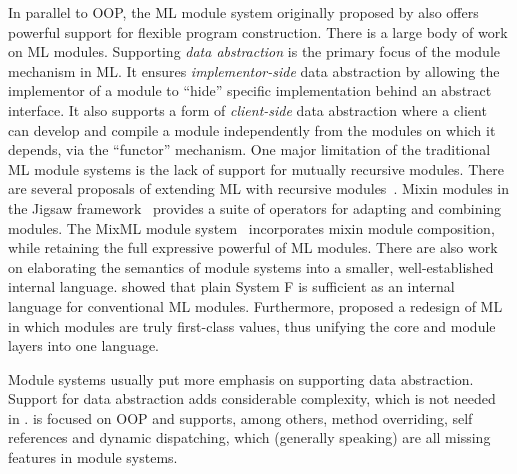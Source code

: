 In parallel to OOP, the ML module system originally proposed by
\citet{MacQueen_1984} also offers powerful support for flexible program
construction. There is a large body of work on ML modules. Supporting
\textit{data abstraction} is the primary focus of the module mechanism in ML. It
ensures \textit{implementor-side} data abstraction by allowing the implementor
of a module to ``hide'' specific implementation behind an abstract interface. It
also supports a form of \textit{client-side} data abstraction where a client can
develop and compile a module independently from the modules on which it depends,
via the ``functor'' mechanism. One major limitation of the traditional ML module
systems is the lack of support for mutually recursive modules. There are several
proposals of extending ML with recursive
modules~\citep{Crary_1999,Rossberg_2013, Russo_2001}. Mixin modules in the
Jigsaw framework~\citep{Bracha92modularitymeets} provides a suite of operators
for adapting and combining modules. The MixML module
system~\citep{Rossberg_2013} incorporates mixin module composition, while
retaining the full expressive powerful of ML modules. There are also work on
elaborating the semantics of module systems into a smaller, well-established
internal language. \citet{ROSSBERG_2014} showed that plain System F is
sufficient as an internal language for conventional ML modules.
Furthermore, \citet{Rossberg_2015} proposed a redesign of ML in which modules are truly
first-class values, thus unifying the core and module layers into one language.

Module systems usually put more emphasis on supporting data abstraction. Support
for data abstraction adds considerable complexity, which is not needed in
\sedel. \sedel is focused on OOP and supports, among others, method overriding,
self references and dynamic dispatching, which (generally speaking) are all
missing features in module systems.




